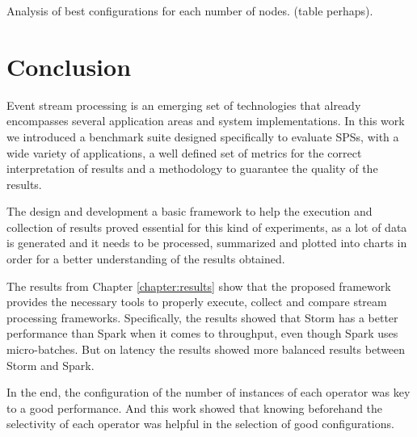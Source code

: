 \documentclass[ppgc,diss,english]{iiufrgs}
\begin{document}
Analysis of best configurations for each number of nodes. (table perhaps).







\chapter{Conclusion}
\label{chapter:conclusion}

Event stream processing is an emerging set of technologies that already encompasses several application areas and system implementations. In this work we introduced a benchmark suite designed specifically to evaluate SPSs, with a wide variety of applications, a well defined set of metrics for the correct interpretation of results and a methodology to guarantee the quality of the results.

The design and development a basic framework to help the execution and collection of results proved essential for this kind of experiments, as a lot of data is generated and it needs to be processed, summarized and plotted into charts in order for a better understanding of the results obtained.

The results from Chapter \ref{chapter:results} show that the proposed framework provides the necessary tools to properly execute, collect and compare stream processing frameworks. Specifically, the results showed that Storm has a better performance than Spark when it comes to throughput, even though Spark uses micro-batches. But on latency the results showed more balanced results between Storm and Spark.

In the end, the configuration of the number of instances of each operator was key to a good performance. And this work showed that knowing beforehand the selectivity of each operator was helpful in the selection of good configurations.
\end{document}
